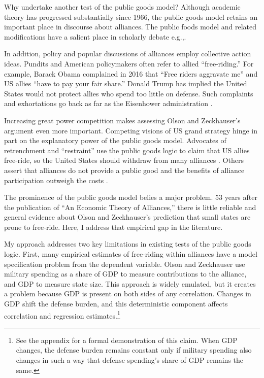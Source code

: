 \documentclass[12pt]{article}
\begin{document}
Why undertake another test of the public goods model? 
Although academic theory has progressed substantially since 1966, the public goods model retains an important place in discourse about alliances.
The public foods model and related modifications \citep{Sandler1993} have a salient place in scholarly debate e.g.,\citep{Walt1990, Mearsheimer1994, Goldstein1995, SandlerHartley2001, Garfinkel2004, Walt2009, Norrlof2010, Barrett2010, PluemperNeumayer2015}. 


In addition, policy and popular discussions of alliances employ collective action ideas.
Pundits and American policymakers often refer to allied ``free-riding.'' 
For example, Barack Obama complained in 2016 that ``Free riders aggravate me'' and US allies ``have to pay your fair share.'' 
Donald Trump has implied the United States would not protect allies who spend too little on defense. 
Such complaints and exhortations go back as far as the Eisenhower administration \citep{Lanoszka2015}.


Increasing great power competition makes assessing Olson and Zeckhauser's argument even more important. 
Competing visions of US grand strategy hinge in part on the explanatory power of the public goods model. 
Advocates of retrenchment and ``restraint'' use the public goods logic to claim that US allies free-ride, so the United States should withdraw from many alliances \citep{Preble2009, Posen2014}. 
Others assert that alliances do not provide a public good and the benefits of alliance participation outweigh the costs \citep{Brooksetal2013, BrandsFeaver2017}. 


The prominence of the public goods model belies a major problem.
53 years after the publication of ``An Economic Theory of Alliances,'' there is little reliable and general evidence about Olson and Zeckhauser's prediction that small states are prone to free-ride. 
Here, I address that empirical gap in the literature. 


My approach addresses two key limitations in existing tests of the public goods logic.
First, many empirical estimates of free-riding within alliances have a model specification problem from the dependent variable.
Olson and Zeckhauser use military spending as a share of GDP to measure contributions to the alliance, and GDP to measure state size.
This approach is widely emulated, but it creates a problem because GDP is present on both sides of any correlation.
Changes in GDP shift the defense burden, and this deterministic component affects correlation and regression estimates.\footnote{
See the appendix for a formal demonstration of this claim. 
When GDP changes, the defense burden remains constant only if military spending also changes in such a way that defense spending's share of GDP remains the same.}  
\end{document}
